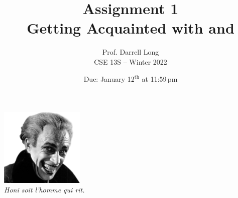 \documentclass[11pt]{article}
\title{Assignment 1 \\ Getting Acquainted with \Unix{} and \C{}}
\author{Prof. Darrell Long \\
CSE 13S -- Winter 2022}
\date{Due: January 12$^\text{th}$ at 11:59\,pm}
\begin{document}
\maketitle












\vfill
\begin{center}
\includegraphics[width=0.3\textwidth]{images/cv.png} \\
\emph{Honi soit l'homme qui rit.}
\end{center}
\end{document}
